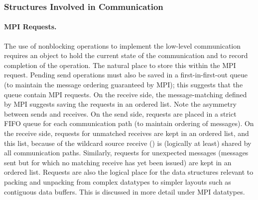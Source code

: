 \subsubsection{Structures Involved in Communication}

\paragraph{MPI Requests.}
The use of nonblocking operations to implement the low-level
communication requires an object to hold the current state of the
communication and to record completion of the operation.  The natural
place to store this within the MPI request.  Pending send operations must
also be saved in a first-in-first-out queue (to maintain the message
ordering guaranteed by MPI); this suggests that the queue contain MPI
requests.  On the receive side, the message-matching defined by MPI
suggests saving the requests in an ordered list.  Note the asymmetry
between sends and receives.  On the send side, requests are placed in
a strict FIFO queue for each communication path (to maintain ordering
of messages).  On the receive side, requests for unmatched receives
are kept in an ordered 
list, and this list, because of the wildcard source receive
() is (logically at least) shared by all
communication paths.  Similarly, requests for unexpected messages
(messages sent but for which no matching receive has yet been issued)
are kept in an ordered list.
Requests are also the logical place for the data structures relevant to packing and
unpacking from complex datatypes to simpler layouts such as contiguous
data buffers.  This is discussed in more detail under MPI datatypes.


